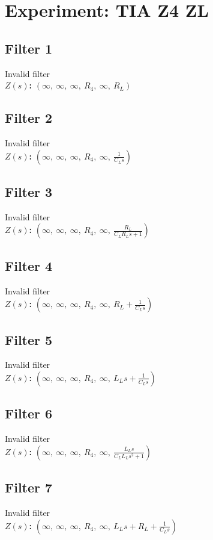 \documentclass{article}
\begin{document}
        \section*{Experiment: TIA Z4 ZL}
\subsection*{Filter 1}
Invalid filter \\ 
\textbf{$Z(s)$:} $\left( \infty, \  \infty, \  \infty, \  R_{4}, \  \infty, \  R_{L}\right)$ \\ 
\subsection*{Filter 2}
Invalid filter \\ 
\textbf{$Z(s)$:} $\left( \infty, \  \infty, \  \infty, \  R_{4}, \  \infty, \  \frac{1}{C_{L} s}\right)$ \\ 
\subsection*{Filter 3}
Invalid filter \\ 
\textbf{$Z(s)$:} $\left( \infty, \  \infty, \  \infty, \  R_{4}, \  \infty, \  \frac{R_{L}}{C_{L} R_{L} s + 1}\right)$ \\ 
\subsection*{Filter 4}
Invalid filter \\ 
\textbf{$Z(s)$:} $\left( \infty, \  \infty, \  \infty, \  R_{4}, \  \infty, \  R_{L} + \frac{1}{C_{L} s}\right)$ \\ 
\subsection*{Filter 5}
Invalid filter \\ 
\textbf{$Z(s)$:} $\left( \infty, \  \infty, \  \infty, \  R_{4}, \  \infty, \  L_{L} s + \frac{1}{C_{L} s}\right)$ \\ 
\subsection*{Filter 6}
Invalid filter \\ 
\textbf{$Z(s)$:} $\left( \infty, \  \infty, \  \infty, \  R_{4}, \  \infty, \  \frac{L_{L} s}{C_{L} L_{L} s^{2} + 1}\right)$ \\ 
\subsection*{Filter 7}
Invalid filter \\ 
\textbf{$Z(s)$:} $\left( \infty, \  \infty, \  \infty, \  R_{4}, \  \infty, \  L_{L} s + R_{L} + \frac{1}{C_{L} s}\right)$ \\ 
\end{document}
